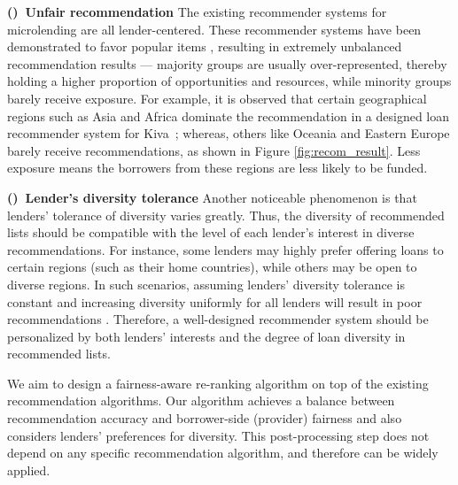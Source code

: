 
\textbf{()~Unfair recommendation} The existing recommender systems for microlending are all lender-centered. These recommender systems have been demonstrated to favor popular items \cite{celma2008hits,lee2014fairness}, resulting in extremely unbalanced recommendation results --- majority groups are usually over-represented, thereby holding a higher proportion of opportunities and resources, while minority groups barely receive exposure. For example, it is observed that certain geographical regions such as Asia and Africa dominate the recommendation in a designed loan recommender system for Kiva~\cite{choo2014gather}; whereas, others like Oceania and Eastern Europe barely receive recommendations, as shown in Figure \ref{fig:recom_result}. Less exposure means the borrowers from these regions are less likely to be funded.


\textbf{()~Lender's diversity tolerance} Another noticeable phenomenon is that lenders' tolerance of diversity varies greatly.  Thus, the diversity of recommended lists should be compatible with the level of each lender's interest in diverse recommendations. For instance, some lenders may highly prefer offering loans to certain regions (such as their home countries), while others may be open to diverse regions. In such scenarios, assuming lenders' diversity tolerance is constant and increasing diversity uniformly for all lenders will result in poor recommendations \cite{eskandanian2017clustering}. Therefore, a well-designed recommender system should be personalized by both lenders' interests and the degree of loan diversity in recommended lists.

We aim to design a fairness-aware re-ranking algorithm on top of the existing recommendation algorithms. Our algorithm achieves a balance between recommendation accuracy and borrower-side (provider) fairness and also considers lenders' preferences for diversity. This post-processing step does not depend on any specific recommendation algorithm, and therefore can be widely applied.


